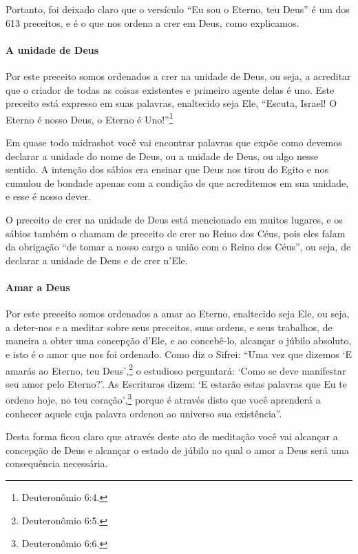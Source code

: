 Portanto, foi deixado claro que o versículo ``Eu sou o Eterno, teu
Deus'' é um dos 613 preceitos, e é o que nos ordena a crer em Deus, como
explicamos.

\paragraph{A unidade de Deus}

Por este preceito somos ordenados a crer na unidade de Deus, ou seja, a
acreditar que o criador de todas as coisas existentes e primeiro agente
delas é uno. Este preceito está expresso em suas palavras, enaltecido
seja Ele, ``Escuta, Israel! O Eterno é nosso Deus, o Eterno é Uno!''\footnote{Deuteronômio 6:4.}

Em quase todo midrashot você vai encontrar palavras que
expõe como devemos declarar a unidade do nome de Deus, ou a unidade
de Deus, ou algo nesse sentido. A intenção dos sábios era ensinar que
Deus nos tirou do Egito e nos cumulou de bondade apenas com a condição
de que acreditemos em sua unidade, e esse é nosso dever.

O preceito de crer na unidade de Deus está mencionado em muitos lugares,
e os sábios também o chamam de preceito de crer no Reino dos Céus,
pois eles falam da obrigação ``de tomar a nosso cargo a união com o
Reino dos Céus'', ou seja, de declarar a unidade de Deus e de crer
n'Ele.

\paragraph{Amar a Deus}

Por este preceito somos ordenados a amar ao Eterno, enaltecido seja
Ele, ou seja, a deter-nos e a meditar sobre seus preceitos, suas ordens,
e seus trabalhos, de maneira a obter uma concepção d'Ele, e ao
concebê-lo, alcançar o júbilo absoluto, e isto é o amor que nos foi
ordenado. Como diz o Sifrei: ``Uma vez que dizemos `E amarás ao Eterno,
teu Deus',\footnote{Deuteronômio 6:5.} o estudioso perguntará: `Como se deve
manifestar seu amor pelo Eterno?'. As Escrituras dizem: `E estarão
estas palavras que Eu te ordeno hoje, no teu coração',\footnote{Deuteronômio
6:6.} porque é através disto que você aprenderá a conhecer aquele cuja
palavra ordenou ao universo sua existência''.

Desta forma ficou claro que através deste ato de meditação você vai
alcançar a concepção de Deus e alcançar o estado de júbilo no qual o
amor a Deus será uma consequência necessária.


